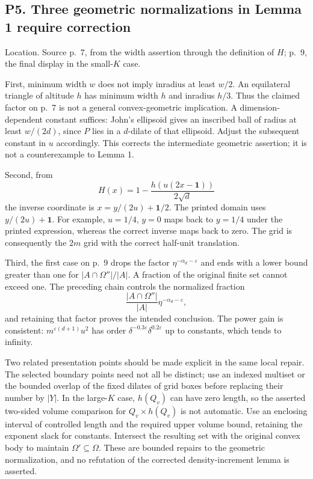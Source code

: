 \documentclass[10pt]{article}
\begin{document}
\subsection*{P5. Three geometric normalizations in Lemma 1 require correction}
Location. Source p. 7, from the width assertion through the definition of \(H\); p. 9, the final display in the small-\(K\) case.\par
First, minimum width \(w\) does not imply inradius at least \(w/2\). An equilateral triangle of altitude \(h\) has minimum width \(h\) and inradius \(h/3\). Thus the claimed factor on p. 7 is not a general convex-geometric implication. A dimension-dependent constant suffices: John’s ellipsoid gives an inscribed ball of radius at least \(w/(2d)\), since \(P\) lies in a \(d\)-dilate of that ellipsoid. Adjust the subsequent constant in \(u\) accordingly. This corrects the intermediate geometric assertion; it is not a counterexample to Lemma 1.\par
Second, from \[H(x)=1-\frac{h(u(2x-\mathbf1))}{2\sqrt d}\] the inverse coordinate is \(x=y/(2u)+\mathbf1/2\). The printed domain uses \(y/(2u)+\mathbf1\). For example, \(u=1/4\), \(y=0\) maps back to \(y=1/4\) under the printed expression, whereas the correct inverse maps back to zero. The grid is consequently the \(2m\) grid with the correct half-unit translation.\par
Third, the first case on p. 9 drops the factor \(\eta^{-\alpha_d-\varepsilon}\) and ends with a lower bound greater than one for \(|A\cap\Omega''|/|A|\). A fraction of the original finite set cannot exceed one. The preceding chain controls the normalized fraction \[\frac{|A\cap\Omega''|}{|A|}\eta^{-\alpha_d-\varepsilon},\] and retaining that factor proves the intended conclusion. The power gain is consistent: \(m^{\varepsilon(d+1)}u^2\) has order \(\delta^{-0.3\varepsilon}\delta^{0.2\varepsilon}\) up to constants, which tends to infinity.\par
Two related presentation points should be made explicit in the same local repair. The selected boundary points need not all be distinct; use an indexed multiset or the bounded overlap of the fixed dilates of grid boxes before replacing their number by \(|Y|\). In the large-\(K\) case, \(h(Q_v)\) can have zero length, so the asserted two-sided volume comparison for \(Q_v\times h(Q_v)\) is not automatic. Use an enclosing interval of controlled length and the required upper volume bound, retaining the exponent slack for constants. Intersect the resulting set with the original convex body to maintain \(\Omega'\subseteq\Omega\). These are bounded repairs to the geometric normalization, and no refutation of the corrected density-increment lemma is asserted.\par
\end{document}
